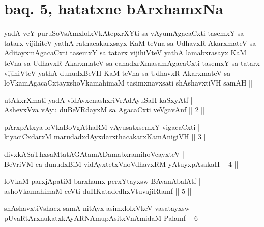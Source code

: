 \section*{baq. 5, hatatxne bArxhamxNa \mdash }

\begin{shl}
yadA veY puruSoV\s sAmxlolxVkAtepxrXYti sa vAyumAgacaCxti tasemxY sa tatarx vijihiteV yathA rathacakarxsayx KaM teVna sa UdhavxR AkarxmateV sa AditayxmAgacaCxti tasemxY sa tatarx vijihiVteV yathA lamabxrasayx KaM teVna sa UdhavxR AkarxmateV sa canadxrXmasamAgacaCxti tasemxY sa tatarx vijihiVteV yathA dunudxBeVH KaM teVna sa UdhavxR AkarxmateV sa loVkamAgacaCxtayxshoVkamahimaM tasimxnavxsati shAshavxtiVH samAH || 
\end{shl}


\begin{shl}
utAkxrXmati yadA vidAvxcnashxriVrAdAyuSaH kaSxyAtf | \\
AshevxVva vAyu duBeVRdayxM sa AgacaCxti veVgavAnf \hfill ||  2 ||
\end{shl}

\begin{shl}
pArxpAtxya loVkaBoVgAthaRM vAyusatxsemxY vigacaCxti | \\
kiyaciCxdarxM marudadxdAyxdarxthacakarxKamAnigiVH \hfill ||  3 || 
\end{shl}

\begin{shl}
divxkASaThxsaMtatAGAtamADamabxramihoVcayxteV | \\
BeVriVM ca dunudxBiM vidAyxtetxVnoVdhavxRM yAtuyxpAsakaH \hfill ||  4 || 
\end{shl}

\begin{shl}
loVkaM parxjApatiM barxhamx perxYtayxsw BAvanAbalAtf | \\
ashoVkamahimaM ceVti duHKatadedhxVtuvajiRtamf \hfill ||  5 || 
\end{shl}

\begin{shl}
shAshavxtiVshacx samA nitAyx asimxlolxVkeV vasatayxsw  | \\
pUvaRtArxnukatxkAyARNAmupAsitxVnAmidaM Palamf \hfill ||  6 || 
\end{shl}

